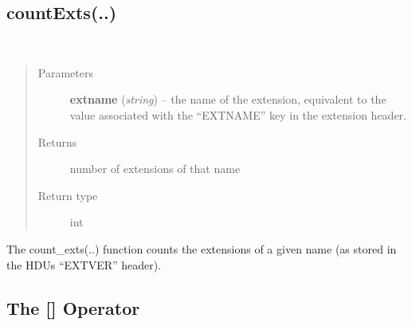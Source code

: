 \documentclass[letterpaper,10pt,english]{sphinxmanual}
\begin{document}
\subsection{countExts(..)}
\label{chapter_AstroDataClass:countexts}

\begin{fulllineitems}
\label{chapter_AstroDataClass:astrodata.data.AstroData.count_exts}~\begin{quote}\begin{description}
\item[{Parameters}] \leavevmode
\textbf{extname} (\emph{string}) -- the name of the extension, equivalent to the
value associated with the ``EXTNAME'' key in the extension 
header.

\item[{Returns}] \leavevmode
number of extensions of that name

\item[{Return type}] \leavevmode
int

\end{description}\end{quote}

The count\_exts(..) function counts the extensions of a given name
(as stored in the HDUs ``EXTVER'' header).

\end{fulllineitems}



\subsection{The {[}{]} Operator}
\label{chapter_AstroDataClass:the-operator}
\end{document}
